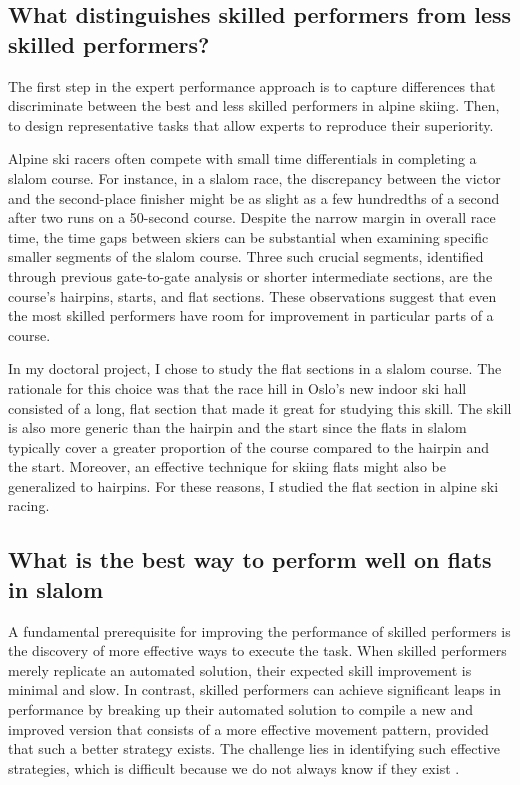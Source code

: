 
\subsection{What distinguishes skilled performers from less skilled performers?}

The first step in the expert performance approach \cite{williams_using_2017, ericsson_prospects_2002, williams_perceptual-cognitive_2005} is to capture differences that discriminate between the best and less skilled performers in alpine skiing. Then, to design representative tasks that allow experts to reproduce their superiority.

Alpine ski racers often compete with small time differentials in completing a slalom course. For instance, in a slalom race, the discrepancy between the victor and the second-place finisher might be as slight as a few hundredths of a second after two runs on a 50-second course. Despite the narrow margin in overall race time, the time gaps between skiers can be substantial when examining specific smaller segments of the slalom course. Three such crucial segments, identified through previous gate-to-gate analysis or shorter intermediate sections, are the course's hairpins, starts, and flat sections\cite{supej_new_2011}. These observations suggest that even the most skilled performers have room for improvement in particular parts of a course.

In my doctoral project, I chose to study the flat sections in a slalom course. The rationale for this choice was that the race hill in Oslo's new indoor ski hall consisted of a long, flat section that made it great for studying this skill. The skill is also more generic than the hairpin and the start since the flats in slalom typically cover a greater proportion of the course compared to the hairpin and the start. Moreover, an effective technique for skiing flats might also be generalized to hairpins. For these reasons, I studied the flat section in alpine ski racing. 


\subsection{What is the best way to perform well on flats in slalom}
A fundamental prerequisite for improving the performance of skilled performers is the discovery of more effective ways to execute the task. When skilled performers merely replicate an automated solution, their expected skill improvement is minimal and slow. In contrast, skilled performers can achieve significant leaps in performance by breaking up their automated solution to compile a new and improved version that consists of a more effective movement pattern, provided that such a better strategy exists. The challenge lies in identifying such effective strategies, which is difficult because we do not always know if they exist \cite{gray_plateaus_2017}.

